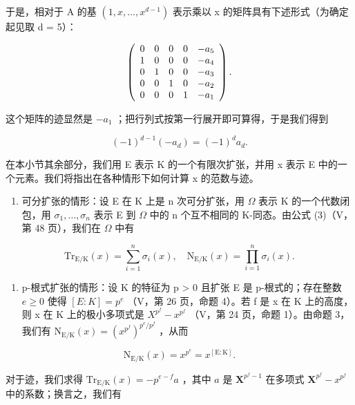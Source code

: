 于是，相对于 A 的基 \((1, x, \ldots, x^{d-1})\) 表示乘以 x 的矩阵具有下述形式（为确定起见取 d = 5）：

\[
\left( \begin{array}{c c c c c} 0 & 0 & 0 & 0 & - a _ {5} \\ 1 & 0 & 0 & 0 & - a _ {4} \\ 0 & 1 & 0 & 0 & - a _ {3} \\ 0 & 0 & 1 & 0 & - a _ {2} \\ 0 & 0 & 0 & 1 & - a _ {1} \end{array} \right).
\]

这个矩阵的迹显然是 \(-a_{1}\) ；把行列式按第一行展开即可算得，于是我们得到

\[
(- 1) ^ {d - 1} (- a _ {d}) = (- 1) ^ {d} a _ {d}.
\]

在本小节其余部分，我们用 E 表示 K 的一个有限次扩张，并用 x 表示 E 中的一个元素。我们将指出在各种情形下如何计算 x 的范数与迹。

\begin{enumerate}
\def\labelenumi{\alph{enumi})}
\tightlist
\item
  可分扩张的情形：设 E 在 K 上是 n 次可分扩张，用 \(\Omega\) 表示 K 的一个代数闭包，用 \(\sigma_{1}, \ldots, \sigma_{n}\) 表示 E 到 \(\Omega\) 中的 n 个互不相同的 K-同态。由公式 (3)（V，第 48 页），我们在 \(\Omega\) 中有
\end{enumerate}

\[
\mathrm{Tr} _ {\mathrm{E} / \mathrm{K}} (x) = \sum_ {i = 1} ^ {n} \sigma_ {i} (x), \quad \mathrm{N} _ {\mathrm{E} / \mathrm{K}} (x) = \prod_ {i = 1} ^ {n} \sigma_ {i} (x).\tag{12}
\]

\begin{enumerate}
\def\labelenumi{\alph{enumi})}
\setcounter{enumi}{1}
\tightlist
\item
  p-根式扩张的情形：设 K 的特征为 p \textgreater{} 0 且扩张 E 是 p-根式的；存在整数 \(e \geqslant 0\) 使得 \([E : K] = p^{e}\) （V，第 26 页，命题 4）。若 f 是 x 在 K 上的高度，则 x 在 K 上的极小多项式是 \(X^{p^{f}} - x^{p^{f}}\) （V，第 24 页，命题 1）。由命题 3，我们有 \(\mathrm{N}_{\mathrm{E}/\mathrm{K}}(x) = (x^{p^{f}})^{p^{e}/p^{f}}\) ，从而
\end{enumerate}

\[
\mathrm{N} _ {\mathrm{E} / \mathrm{K}} (x) = x ^ {p ^ {e}} = x ^ {[ \mathrm{E}: \mathrm{K} ]}.\tag{13}
\]

对于迹，我们求得 \(\mathrm{Tr}_{\mathrm{E} / \mathrm{K}}(x) = -p^{e - f}a\) ，其中 \(a\) 是 \(\mathbf{X}^{p^f - 1}\) 在多项式 \(\mathbf{X}^{p^f} - x^{p^f}\) 中的系数；换言之，我们有


